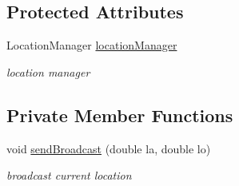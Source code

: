 \subsection*{Protected Attributes}
\begin{DoxyCompactItemize}
\item 
Location\+Manager \mbox{\hyperlink{classhi_1_1world_1_1hello_1_1myapplication_1_1_gps_service_af07bc224afddbe62529efca8dc49fd9b}{location\+Manager}}
\begin{DoxyCompactList}\small\item\em location manager \end{DoxyCompactList}\end{DoxyCompactItemize}
\subsection*{Private Member Functions}
\begin{DoxyCompactItemize}
\item 
void \mbox{\hyperlink{classhi_1_1world_1_1hello_1_1myapplication_1_1_gps_service_af0aab7413bb674828f99d498c5c50de7}{send\+Broadcast}} (double la, double lo)
\begin{DoxyCompactList}\small\item\em broadcast current location \end{DoxyCompactList}\end{DoxyCompactItemize}
